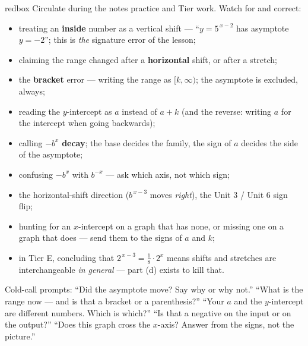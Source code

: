 \documentclass[10pt]{article}
\begin{document}
\begin{skillbox}{redbox}
Circulate during the notes practice and Tier work. Watch for and correct:
\begin{itemize}[leftmargin=1.2em, nosep]
  \item treating an \textbf{inside} number as a vertical shift --- ``$y=5^{\,x-2}$ has asymptote $y=-2$''; this is \emph{the} signature error of the lesson;
  \item claiming the range changed after a \textbf{horizontal} shift, or after a stretch;
  \item the \textbf{bracket} error --- writing the range as $[k,\infty)$; the asymptote is excluded, always;
  \item reading the $y$-intercept as $a$ instead of $a+k$ (and the reverse: writing $a$ for the intercept when going backwards);
  \item calling $-b^{x}$ \textbf{decay}; the base decides the family, the sign of $a$ decides the side of the asymptote;
  \item confusing $-b^{x}$ with $b^{-x}$ --- ask which axis, not which sign;
  \item the horizontal-shift direction ($b^{\,x-3}$ moves \emph{right}), the Unit 3 / Unit 6 sign flip;
  \item hunting for an $x$-intercept on a graph that has none, or missing one on a graph that does --- send them to the signs of $a$ and $k$;
  \item in Tier E, concluding that $2^{\,x-3}=\frac18\cdot2^{x}$ means shifts and stretches are interchangeable \emph{in general} --- part (d) exists to kill that.
\end{itemize}
Cold-call prompts: ``Did the asymptote move? Say why or why not.'' ``What is the range now --- and is
that a bracket or a parenthesis?'' ``Your $a$ and the $y$-intercept are different numbers. Which is
which?'' ``Is that a negative on the input or on the output?'' ``Does this graph cross the $x$-axis?
Answer from the signs, not the picture.''
\end{skillbox}
\end{document}
